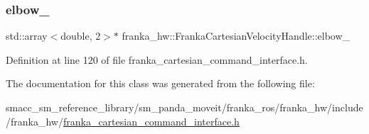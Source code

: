 \mbox{\label{classfranka__hw_1_1FrankaCartesianVelocityHandle_a94e376a17a17c473b9ad4168bcbc5e61}} 
\subsubsection{\texorpdfstring{elbow\+\_\+}{elbow\_}}
{\footnotesize\ttfamily std\+::array$<$double, 2$>$$\ast$ franka\+\_\+hw\+::\+Franka\+Cartesian\+Velocity\+Handle\+::elbow\+\_\+\hspace{0.3cm}{\ttfamily [private]}}



Definition at line 120 of file franka\+\_\+cartesian\+\_\+command\+\_\+interface.\+h.



The documentation for this class was generated from the following file\+:\begin{DoxyCompactItemize}
\item 
smacc\+\_\+sm\+\_\+reference\+\_\+library/sm\+\_\+panda\+\_\+moveit/franka\+\_\+ros/franka\+\_\+hw/include/franka\+\_\+hw/\hyperlink{franka__cartesian__command__interface_8h}{franka\+\_\+cartesian\+\_\+command\+\_\+interface.\+h}\end{DoxyCompactItemize}
